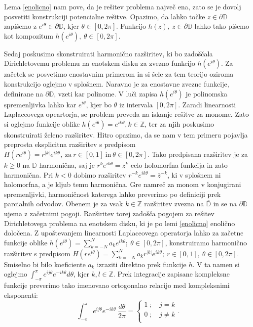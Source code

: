 \documentclass[mat1]{fmfdelo}
\begin{document}
    Lema \ref{enolicno} nam pove, da je rešitev problema največ ena, zato se je dovolj posvetiti konstrukciji potencialne rešitve. 
    Opazimo, da lahko točke $z \in \partial \mathbb{D}$ zapišemo z $e^{i \theta} \in \partial \mathbb{D}$, kjer $\theta \in [0,2\pi]$. Funkcijo $h(z),~z \in \partial \mathbb{D}$ lahko tako pišemo kot kompozitum $h(e^{i \theta}),~\theta \in [0,2\pi]$.
    
    Sedaj poskusimo skonstruirati harmonično razširitev, ki bo zadoščala Dirichletovemu problemu na enotskem disku za zvezno funkcijo $h(e^{i \theta})$.
    Za začetek se posvetimo enostavnim primerom in si šele za tem teorijo oziroma konstrukcijo oglejmo v splošnem. 
    Naravno je za enostavne zvezne funkcije, definirane na $\partial \mathbb{D}$, vzeti kar polinome. V luči zapisa $h(e^{i\theta})$ je polinomska spremenljivka lahko kar $e^{i\theta}$, kjer bo $\theta$ iz intervala $[0,2\pi]$. 
    Zaradi linearnosti Laplaceovega opeartorja, se problem preveda na iskanje rešitve za monome. 
    Zato si oglejmo funkcije oblike $h(e^{i \theta}) = e^{i k \theta}, k \in \mathbb{Z}$, ter za njih poskusimo skonstruirati želeno razširitev. 
    Hitro opazimo, da se nam v tem primeru pojavlja preprosta eksplicitna razširitev s predpisom $H(r e^{i \theta}) = r^{|k|}e^{i k \theta},~\text{za}~r\in [0, 1]~\text{in}~\theta \in [0, 2\pi]$. 
    Tako predpisana razširitev je za $k \geq 0$ na $\mathbb{D}$ harmonična, saj je $r^k e^{ik\theta} = z^k$ celo holomorfna funkcija in zato harmonična. Pri $k < 0$ dobimo razširitev $r^{-k} e^{ik\theta} = \overline{z}^{-k}$, ki v splošnem ni holomorfna, a je \mbox{kljub} temu harmonična. 
    Gre namreč za monom v konjugirani spremenljivki, harmoničnost katerega lahko preverimo po definiciji prek parcialnih odvodov.
    Obenem je za vsak $k \in \mathbb{Z}$ razširitev zvezna na $\overline{\mathbb{D}}$ in se na $\partial \mathbb{D}$ ujema z začetnimi pogoji. Razširitev torej zadošča pogojem za rešitev Dirichletovega problema na enotskem disku, ki je po lemi \ref{enolicno} enolično določena. 
    Z upoštevanjem linearnosti Laplaceovega operatorja lahko za začetne funkcije oblike $h(e^{i\theta}) = \sum_{k = -N}^{N}{a_k e^{ik\theta}};~\theta \in [0,2\pi]$, konstruiramo harmonično razširitev s predpisom
    $H(r e^{i \theta}) = \sum_{k = -N}^{N}{a_k r^{|k|}e^{ik\theta}};~r \in [0,1],~\theta \in [0,2\pi]$. Smiselno bi bilo koeficiente $a_k$ izraziti direktno prek funkcije $h$. 
    V ta namen si oglejmo $\int_{-\pi}^{\pi}{e^{ij\theta} e^{-ik\theta}d\theta}$, kjer $k,l \in \mathbb{Z}$. Prek integracije zapisane kompleksne funkcije preverimo tako imenovano ortogonalno relacijo med kompleksnimi eksponenti:
        $$
        \int_{-\pi}^{\pi}{e^{ij\theta} e^{-ik\theta}~\frac{d\theta}{2\pi}} = 
        \begin{cases}
            1~;~&j=k\\
            0~;~&j \neq k\\
        \end{cases}
        .$$
\end{document}
